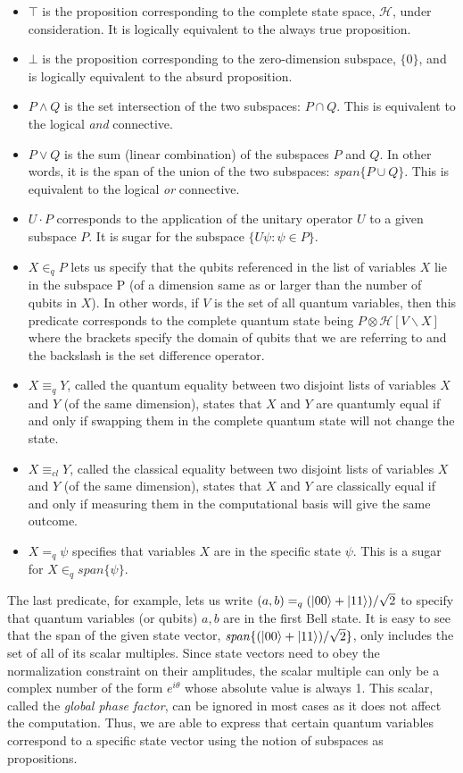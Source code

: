 \begin{itemize}
	\item $\top$ is the proposition corresponding to the complete state space, $\mathcal{H}$, under consideration. It is logically equivalent to the always true proposition.
	\item $\bot$ is the proposition corresponding to the zero-dimension subspace, $\{0\}$, and is logically equivalent to the absurd proposition.
	\item $P \wedge Q$ is the set intersection of the two subspaces: $P \cap Q$. This is equivalent to the logical \textit{and} connective.
	\item $P \vee Q$ is the sum (linear combination) of the subspaces $P$ and $Q$. In other words, it is the span of the union of the two subspaces: $\mathit{span}\{P \cup Q\}$. This is equivalent to the logical \textit{or} connective.
	\item $U \cdot P$ corresponds to the application of the unitary operator $U$ to a given subspace $P$. It is sugar for the subspace $\{U \psi: \psi \in P\}$.
	\item\label{itm:partnot} $X \in_q P$ lets us specify that the qubits referenced in the list of variables $X$ lie in the subspace P (of a dimension same as or larger than the number of qubits in $X$). In other words, if $V$ is the set of all quantum variables, then this predicate corresponds to the complete quantum state being $P \otimes \mathcal{H}[V \backslash X]$ where the brackets specify the domain of qubits that we are referring to and the backslash is the set difference operator.
	\item $X \equiv_q Y$, called the quantum equality between two disjoint lists of variables $X$ and $Y$ (of the same dimension), states that $X$ and $Y$ are quantumly equal if and only if swapping them in the complete quantum state will not change the state.
	\item $X \equiv_{cl} Y$, called the classical equality between two disjoint lists of variables $X$ and $Y$ (of the same dimension), states that $X$ and $Y$ are classically equal if and only if measuring them in the computational basis will give the same outcome.
	\item $X =_q \psi$ specifies that variables $X$ are in the specific state $\psi$. This is a sugar for $X \in_q \mathit{span}\{\psi\}$.
\end{itemize}

The last predicate, for example, lets us write $(a, b) =_q (\ket{00}+\ket{11})/\sqrt{2}$ to specify that quantum variables (or qubits) $a, b$ are in the first Bell state. It is easy to see that the span of the given state vector, $\mathit{span}\{(\ket{00}+\ket{11})/\sqrt{2}\}$, only includes the set of all of its scalar multiples. Since state vectors need to obey the normalization constraint on their amplitudes, the scalar multiple can only be a complex number of the form $e^{i\theta}$ whose absolute value is always 1. This scalar, called the \textit{global phase factor}, can be ignored in most cases as it does not affect the computation. Thus, we are able to express that certain quantum variables correspond to a specific state vector using the notion of subspaces as propositions.

